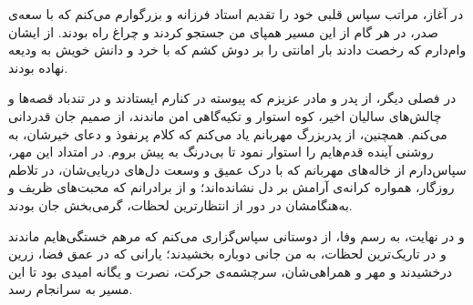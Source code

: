 %
%

\vspace*{3.5cm}
\begin{thesisacknowledgments}
در آغاز، مراتب سپاس قلبی خود را تقدیم استاد فرزانه و بزرگوارم می‌کنم که با سعه‌ی صدر، در هر گام از این مسیر همپای من جستجو کردند و چراغ راه بودند. از ایشان وام‌دارم که رخصت دادند بار امانتی را بر دوش کشم که با خرد و دانش خویش به ودیعه نهاده بودند.

در فصلی دیگر، از پدر و مادر عزیزم که پیوسته در کنارم ایستادند و در تندباد قصه‌ها و چالش‌های سالیان اخیر، کوه استوار و تکیه‌گاهی امن ماندند، از صمیم جان قدردانی می‌کنم. همچنین، از پدربزرگ مهربانم یاد می‌کنم که کلام پرنفوذ و دعای خیرشان، به روشنی آینده قدم‌هایم را استوار نمود تا بی‌درنگ به پیش بروم. در امتداد این مهر، سپاس‌دارم از خاله‌های مهربانم که با درک عمیق و وسعت دل‌های دریایی‌شان، در تلاطم روزگار، همواره کرانه‌ی آرامش بر دل نشانده‌اند؛ و از برادرانم که محبت‌های ظریف و به‌هنگامشان در دور از انتظارترین لحظات، گرمی‌بخش جان بودند.

و در نهایت، به رسم وفا، از دوستانی سپاس‌گزاری می‌کنم که مرهم خستگی‌هایم ماندند و در تاریک‌ترین لحظات، به من جانی دوباره بخشیدند؛ یارانی که در عمق فضا، زرین درخشیدند و مهر و همراهی‌شان، سرچشمه‌ی حرکت، نصرت و یگانه امیدی بود تا این مسیر به سرانجام رسد.
\end{thesisacknowledgments}
